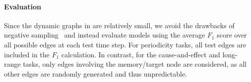 
\paragraph{Evaluation}
Since the dynamic graphs in \benchmarkname are relatively small, we avoid the drawbacks of negative sampling~\cite{poursafaei2022betterevaluationdynamiclink} and instead evaluate models using the average $F_1$ score over all possible edges at each test time step. For periodicity tasks, all test edges are included in the $F_1$ calculation. In contrast, for the cause-and-effect and long-range tasks, only edges involving the memory/target node are considered, as all other edges are randomly generated and thus unpredictable. 



